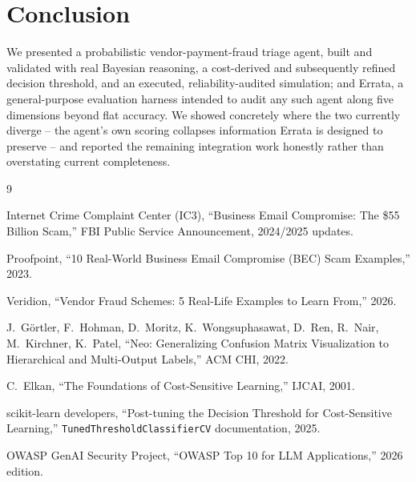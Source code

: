 \documentclass[10pt]{article}
\begin{document}
\section{Conclusion}

We presented a probabilistic vendor-payment-fraud triage agent,
built and validated with real Bayesian reasoning, a cost-derived
and subsequently refined decision threshold, and an executed,
reliability-audited simulation; and Errata, a general-purpose
evaluation harness intended to audit any such agent along five
dimensions beyond flat accuracy. We showed concretely where the two
currently diverge -- the agent's own scoring collapses information
Errata is designed to preserve -- and reported the remaining
integration work honestly rather than overstating current completeness.


\begin{thebibliography}{9}

 Internet Crime Complaint Center (IC3), ``Business
Email Compromise: The \$55 Billion Scam,'' FBI Public Service
Announcement, 2024/2025 updates.

 Proofpoint, ``10 Real-World Business Email
Compromise (BEC) Scam Examples,'' 2023.

 Veridion, ``Vendor Fraud Schemes: 5 Real-Life
Examples to Learn From,'' 2026.

 J.\ G\"ortler, F.\ Hohman, D.\ Moritz, K.\
Wongsuphasawat, D.\ Ren, R.\ Nair, M.\ Kirchner, K.\ Patel, ``Neo:
Generalizing Confusion Matrix Visualization to Hierarchical and
Multi-Output Labels,'' ACM CHI, 2022.

 C.\ Elkan, ``The Foundations of Cost-Sensitive
Learning,'' IJCAI, 2001.

 scikit-learn developers, ``Post-tuning the
Decision Threshold for Cost-Sensitive Learning,''
\texttt{TunedThresholdClassifierCV} documentation, 2025.

 OWASP GenAI Security Project, ``OWASP Top 10 for
LLM Applications,'' 2026 edition.

\end{thebibliography}

\onecolumn
\appendix
\end{document}
